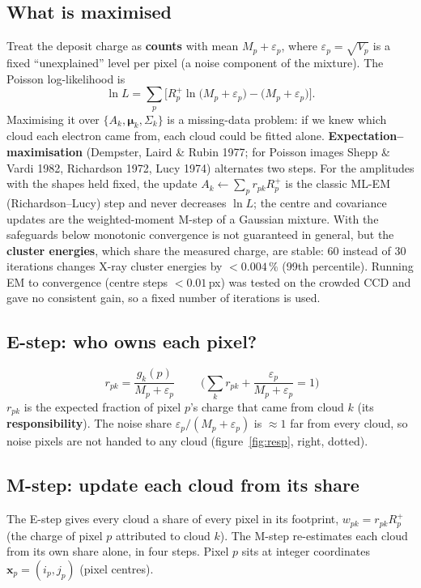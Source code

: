 \documentclass[11pt,a4paper]{article}
\begin{document}
\subsection{What is maximised}
Treat the deposit charge as \textbf{counts} with mean $M_p+\varepsilon_p$, where $\varepsilon_p=\sqrt{V_p}$ is a fixed
``unexplained'' level per pixel (a noise component of the mixture). The Poisson log-likelihood is
\begin{equation}
\ln L=\sum_p\Big[R_p^+\ln\big(M_p+\varepsilon_p\big)-\big(M_p+\varepsilon_p\big)\Big].
\end{equation}
Maximising it over $\{A_k,\bm\mu_k,\Sigma_k\}$ is a missing-data problem: if we knew which cloud each electron came from, each
cloud could be fitted alone. \textbf{Expectation--maximisation} (Dempster, Laird \& Rubin 1977; for Poisson images Shepp \&
Vardi 1982, Richardson 1972, Lucy 1974) alternates two steps. For the amplitudes with the shapes held fixed, the update
$A_k\leftarrow\sum_p r_{pk}R_p^+$ is the classic ML-EM (Richardson--Lucy) step and never decreases $\ln L$; the centre and
covariance updates are the weighted-moment M-step of a Gaussian mixture. With the safeguards below monotonic convergence is
not guaranteed in general, but the \textbf{cluster energies}, which share the measured charge, are stable: 60 instead of 30
iterations changes X-ray cluster energies by $<0.004\,\%$ (99th percentile). Running EM to convergence (centre steps
$<0.01$\,px) was tested on the crowded CCD and gave no consistent gain, so a fixed number of iterations is used.

\subsection{E-step: who owns each pixel?}
\begin{equation}
\boxed{\;r_{pk}=\frac{g_k(p)}{M_p+\varepsilon_p}\;}\qquad
\Big(\textstyle\sum_k r_{pk}+\frac{\varepsilon_p}{M_p+\varepsilon_p}=1\Big)
\end{equation}
$r_{pk}$ is the expected fraction of pixel $p$'s charge that came from cloud $k$ (its \textbf{responsibility}). The noise
share $\varepsilon_p/(M_p+\varepsilon_p)$ is $\approx1$ far from every cloud, so noise pixels are not handed to any cloud
(figure~\ref{fig:resp}, right, dotted).

\subsection{M-step: update each cloud from its share}
The E-step gives every cloud a share of every pixel in its footprint, $w_{pk}=r_{pk}R_p^+$ (the charge of pixel $p$ attributed to
cloud $k$). The M-step re-estimates each cloud from its own share alone, in four steps. Pixel $p$ sits at integer coordinates
$\mathbf x_p=(i_p,j_p)$ (pixel centres).
\end{document}
